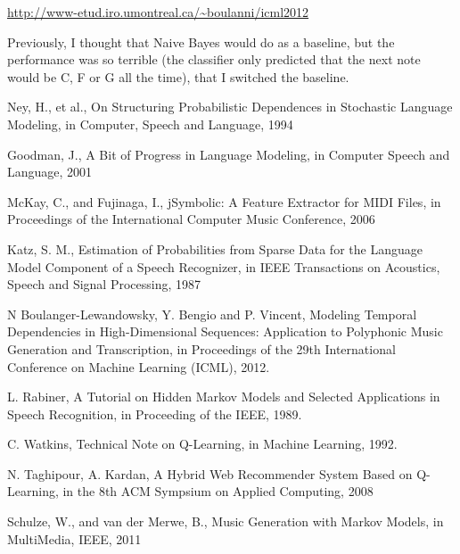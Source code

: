 \documentclass{article}
\begin{document}
\url{http://www-etud.iro.umontreal.ca/~boulanni/icml2012}

Previously, I thought that Naive Bayes would do as a baseline, but the performance was so terrible (the classifier only predicted that the next note would be C, F or G all the time), that I switched the baseline.

\begin{thebibliography}{9}%

Ney, H., et al., On Structuring Probabilistic Dependences in Stochastic Language Modeling, in Computer, Speech and Language, 1994

Goodman, J., A Bit of Progress in Language Modeling, in Computer Speech and Language, 2001

McKay, C., and Fujinaga, I., jSymbolic: A Feature Extractor for MIDI Files, in Proceedings of the International Computer Music Conference, 2006

Katz, S. M., Estimation of Probabilities from Sparse Data for the Language Model Component of a Speech Recognizer, in IEEE Transactions on Acoustics, Speech and Signal Processing, 1987

N Boulanger-Lewandowsky, Y. Bengio and P. Vincent, Modeling Temporal Dependencies in High-Dimensional Sequences: Application to Polyphonic Music Generation and Transcription, in Proceedings of the 29th International Conference on Machine Learning (ICML), 2012.

L. Rabiner, A Tutorial on Hidden Markov Models and Selected Applications in Speech Recognition, in Proceeding of the IEEE, 1989.

C. Watkins, Technical Note on Q-Learning, in Machine Learning, 1992.

N. Taghipour, A. Kardan, A Hybrid Web Recommender System Based on Q-Learning, in the 8th ACM Sympsium on Applied Computing, 2008

Schulze, W., and van der Merwe, B., Music Generation with Markov Models, in MultiMedia, IEEE, 2011

\end{thebibliography}
\end{document}
